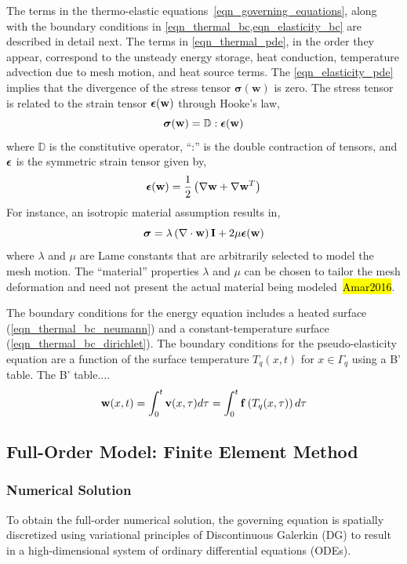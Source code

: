 The terms in the thermo-elastic equations~\cref{eqn_governing_equations}, along with the boundary conditions in \cref{eqn_thermal_bc,eqn_elasticity_bc} are described in detail next. The terms in \cref{eqn_thermal_pde}, in the order they appear, correspond to the unsteady energy storage, heat conduction, temperature advection due to mesh motion, and heat source terms. The \cref{eqn_elasticity_pde} implies that the divergence of the stress tensor $\boldsymbol{\sigma}(\mathbf{w})$ is zero. The stress tensor is related to the strain tensor $\boldsymbol{\epsilon}(\mathbf{w})$ through Hooke's law,
\[
    \boldsymbol{\sigma}(\mathbf{w}) = \mathbb{D}:\boldsymbol{\epsilon}(\mathbf{w})
\]
where $\mathbb{D}$ is the constitutive operator, ``:'' is the double contraction of tensors, and $\boldsymbol{\epsilon}$ is the symmetric strain tensor given by,
\[
    \boldsymbol{\epsilon}(\mathbf{w}) = \frac{1}{2}\left(\nabla\mathbf{w} + \nabla\mathbf{w}^T\right)
\]
For instance, an isotropic material assumption results in,
\[
    \boldsymbol{\sigma} = \lambda\left(\nabla\cdot\mathbf{w}\right) \mathbf{I} + 2\mu\boldsymbol{\epsilon}(\mathbf{w})
\]
where $\lambda$ and $\mu$ are Lame constants that are arbitrarily selected to model the mesh motion. The ``material'' properties $\lambda$ and $\mu$ can be chosen to tailor the mesh deformation and need not present the actual material being modeled~\hl{Amar2016}. 

The boundary conditions for the energy equation includes a heated surface (\cref{eqn_thermal_bc_neumann}) and a constant-temperature surface (\cref{eqn_thermal_bc_dirichlet}). The boundary conditions for the pseudo-elasticity equation are a function of the surface temperature $T_q(x,t)$ for $x\in\Gamma_q$ using a B' table. The B' table....
\begin{equation}
    \mathbf{w}(x,t) = \int_{0}^{t} \mathbf{v}(x,\tau)d\tau = \int_{0}^{t}\mathbf{f}\left(T_q(x,\tau)\right)d\tau
\end{equation}


\subsection{Full-Order Model: Finite Element Method}

\subsubsection{Numerical Solution}

To obtain the full-order numerical solution, the governing equation is spatially discretized using variational principles of Discontinuous Galerkin (DG) to result in a high-dimensional system of ordinary differential equations (ODEs). 

